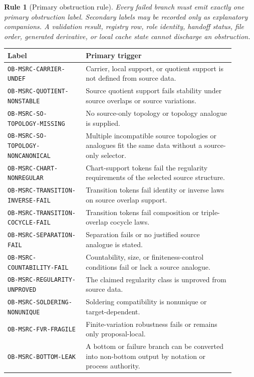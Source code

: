 \documentclass[11pt]{article}
\newtheorem{rulebox}{Rule}
\begin{document}
\begin{rulebox}[Primary obstruction rule]
Every failed branch must emit exactly one primary obstruction label. Secondary
labels may be recorded only as explanatory companions. A validation result,
registry row, role identity, handoff status, file order, generated derivative,
or local cache state cannot discharge an obstruction.
\end{rulebox}

\begin{longtable}{|p{0.31\linewidth}|p{0.59\linewidth}|}
\hline
\textbf{Label} & \textbf{Primary trigger} \\
\hline
\texttt{OB-MSRC-CARRIER-UNDEF} & Carrier, local support, or quotient support is not defined from source data. \\
\hline
\texttt{OB-MSRC-QUOTIENT-NONSTABLE} & Source quotient support fails stability under source overlaps or source variations. \\
\hline
\texttt{OB-MSRC-SO-TOPOLOGY-MISSING} & No source-only topology or topology analogue is supplied. \\
\hline
\texttt{OB-MSRC-SO-TOPOLOGY-NONCANONICAL} & Multiple incompatible source topologies or analogues fit the same data without a source-only selector. \\
\hline
\texttt{OB-MSRC-CHART-NONREGULAR} & Chart-support tokens fail the regularity requirements of the selected source structure. \\
\hline
\texttt{OB-MSRC-TRANSITION-INVERSE-FAIL} & Transition tokens fail identity or inverse laws on source overlap support. \\
\hline
\texttt{OB-MSRC-TRANSITION-COCYCLE-FAIL} & Transition tokens fail composition or triple-overlap cocycle laws. \\
\hline
\texttt{OB-MSRC-SEPARATION-FAIL} & Separation fails or no justified source analogue is stated. \\
\hline
\texttt{OB-MSRC-COUNTABILITY-FAIL} & Countability, size, or finiteness-control conditions fail or lack a source analogue. \\
\hline
\texttt{OB-MSRC-REGULARITY-UNPROVED} & The claimed regularity class is unproved from source data. \\
\hline
\texttt{OB-MSRC-SOLDERING-NONUNIQUE} & Soldering compatibility is nonunique or target-dependent. \\
\hline
\texttt{OB-MSRC-FVR-FRAGILE} & Finite-variation robustness fails or remains only proposal-local. \\
\hline
\texttt{OB-MSRC-BOTTOM-LEAK} & A bottom or failure branch can be converted into non-bottom output by notation or process authority. \\

\end{longtable}
\end{document}
